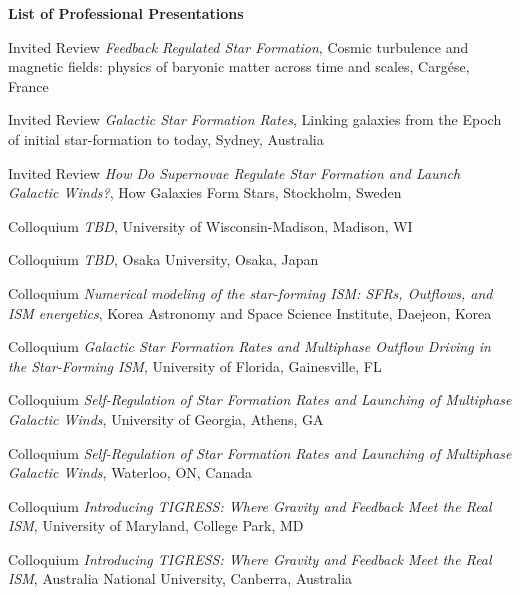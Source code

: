 \documentclass[12pt]{article}
\begin{document}
\begin{center}
{\large \bf List of Professional Presentations}
\end{center}


{Invited Review}
{\emph{Feedback Regulated Star Formation},
Cosmic turbulence and magnetic fields: physics of baryonic matter across time and scales,
Carg\'ese, France}

{Invited Review}
{\emph{Galactic Star Formation Rates},
Linking galaxies from the Epoch of initial star-formation to today,
Sydney, Australia}

{Invited Review}
{\emph{How Do Supernovae Regulate Star Formation and Launch Galactic Winds?},
How Galaxies Form Stars,
Stockholm, Sweden}



{Colloquium}
{\emph{TBD},
University of Wisconsin-Madison,
Madison, WI}

{Colloquium}
{\emph{TBD},
Osaka University,
Osaka, Japan}

{Colloquium}
{\emph{Numerical modeling of the star-forming ISM:  SFRs, Outflows, and ISM energetics},
Korea Astronomy and Space Science Institute,
Daejeon, Korea}

{Colloquium}
{\emph{Galactic Star Formation Rates and Multiphase Outflow Driving in the Star-Forming ISM},
University of Florida,
Gainesville, FL}

{Colloquium}
{\emph{Self-Regulation of Star Formation Rates and Launching of Multiphase Galactic Winds},
University of Georgia,
Athens, GA}

{Colloquium}
{\emph{Self-Regulation of Star Formation Rates and Launching of Multiphase Galactic Winds},
Waterloo,
ON, Canada}

{Colloquium}
{\emph{Introducing TIGRESS: Where Gravity and Feedback Meet the Real ISM},
University of Maryland,
College Park, MD}

{Colloquium}
{\emph{Introducing TIGRESS: Where Gravity and Feedback Meet the Real ISM},
Australia National University,
Canberra, Australia}
\end{document}
